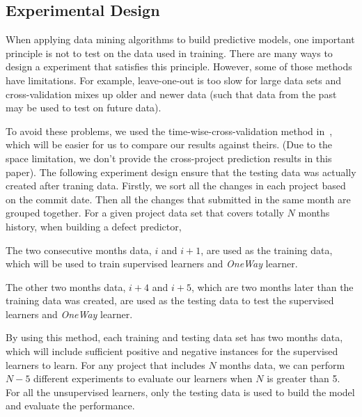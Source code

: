 \subsection{Experimental Design}\label{exp_design}

When applying data mining algorithms to build predictive models,
one important principle is not to test on the data used in training. 
There are many ways to design a experiment that satisfies this principle.
However, some of those methods have limitations. For example, 
leave-one-out is too slow for large data sets and cross-validation mixes up older and newer data
(such that data from the past may be used to test on future data). 

To avoid these problems, we used the time-wise-cross-validation method in~\cite{yang2016effort},
which will be easier for us to compare our results against theirs.
(Due to the space limitation,
we don't provide the cross-project prediction results in this paper).
The following experiment design ensure that the testing data was actually
created after traning data.
Firstly, we sort all the changes in each project based on the commit date. 
Then all the changes that submitted in the same month are grouped together.
For a given project data set that covers totally $N$ months history, when building
a defect predictor,
\bi 
\item The two consecutive months data,  $i$ and $i+1$, are used as the training data, which will be used
to train supervised learners and {\it OneWay} learner.
\item The other two months data, $i+4$ and $i+5$, which are
two months later than the training data was created, are used as
the testing data to test the supervised learners and {\it OneWay} learner.
\ei

By using this method, each training and testing data set
has two months data, which will include sufficient positive and negative instances
for the supervised learners to learn. For any project that includes $N$ months data,
we can perform $N-5$ different experiments to evaluate our learners when $N$ is greater than 5.
For all the unsupervised learners, only the testing data 
is used to build the model and evaluate the performance.

